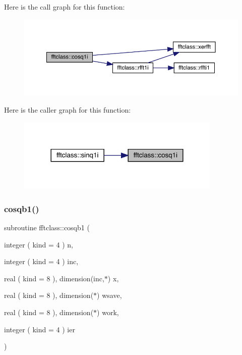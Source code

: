 Here is the call graph for this function\+:\nopagebreak
\begin{figure}[H]
\begin{center}
\leavevmode
\includegraphics[width=350pt]{namespacefftclass_ab281b0d26ef5d825f00696ab35e18e65_cgraph}
\end{center}
\end{figure}
Here is the caller graph for this function\+:\nopagebreak
\begin{figure}[H]
\begin{center}
\leavevmode
\includegraphics[width=276pt]{namespacefftclass_ab281b0d26ef5d825f00696ab35e18e65_icgraph}
\end{center}
\end{figure}
\mbox{\label{namespacefftclass_a4f908baf4cda5a6be5b71eb85fc9309c}} 
\subsubsection{\texorpdfstring{cosqb1()}{cosqb1()}}
{\footnotesize\ttfamily subroutine fftclass\+::cosqb1 (\begin{DoxyParamCaption}\item[{integer ( kind = 4 )}]{n,  }\item[{integer ( kind = 4 )}]{inc,  }\item[{real ( kind = 8 ), dimension(inc,$\ast$)}]{x,  }\item[{real ( kind = 8 ), dimension($\ast$)}]{wsave,  }\item[{real ( kind = 8 ), dimension($\ast$)}]{work,  }\item[{integer ( kind = 4 )}]{ier }\end{DoxyParamCaption})}

